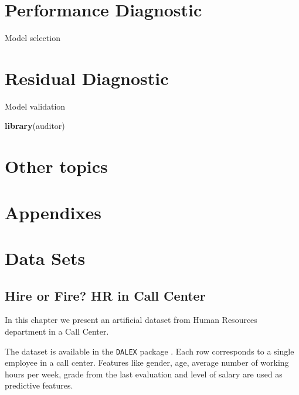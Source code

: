 \documentclass[]{krantz}
\newenvironment{Shaded}{\begin{snugshade}}{\end{snugshade}}
\newcommand{\KeywordTok}[1]{\textcolor[rgb]{0.13,0.29,0.53}{\textbf{#1}}}
\newcommand{\NormalTok}[1]{#1}
\theoremstyle{definition}
\theoremstyle{definition}
\theoremstyle{definition}
\theoremstyle{remark}
\begin{document}
\hypertarget{modelComparisons}{%
\section{Performance Diagnostic}\label{modelComparisons}}

Model selection

\hypertarget{modelAuditing}{%
\section{Residual Diagnostic}\label{modelAuditing}}

Model validation

\citep{R-auditor}

\begin{Shaded}
\begin{Highlighting}[]
\KeywordTok{library}\NormalTok{(auditor)}
\end{Highlighting}
\end{Shaded}

\hypertarget{other-topics}{%
\section{Other topics}\label{other-topics}}

\citep{R-randomForestExplainer} \citep{R-ICEbox} \citep{R-ALEPlot}

\citep{R-modelDown}

\hypertarget{appendixes}{%
\section*{Appendixes}\label{appendixes}}

\hypertarget{DataSets}{%
\section{Data Sets}\label{DataSets}}

\hypertarget{HRdataset}{%
\subsection{Hire or Fire? HR in Call Center}\label{HRdataset}}

In this chapter we present an artificial dataset from Human Resources
department in a Call Center.

The dataset is available in the \texttt{DALEX} package \citep{R-DALEX}.
Each row corresponds to a single employee in a call center. Features
like gender, age, average number of working hours per week, grade from
the last evaluation and level of salary are used as predictive features.
\end{document}
